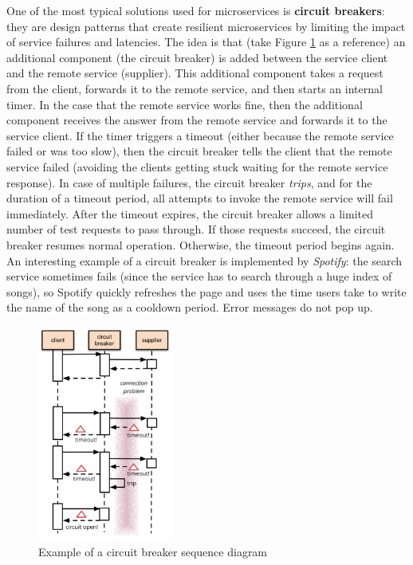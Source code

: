 One of the most typical solutions used for microservices is \textbf{circuit breakers}: they are design patterns that create resilient microservices by limiting the impact of service failures and latencies. The idea is that (take Figure \ref{fig:circuit-breaker} as a reference) an additional component (the circuit breaker) is added between the service client and the remote service (supplier). This additional component takes a request from the client, forwards it to the remote service, and then starts an internal timer. In the case that the remote service works fine, then the additional component receives the answer from the remote service and forwards it to the service client. If the timer triggers a timeout (either because the remote service failed or was too slow), then the circuit breaker tells the client that the remote service failed (avoiding the clients getting stuck waiting for the remote service response). In case of multiple failures, the circuit breaker \textit{trips}, and for the duration of a timeout period, all attempts to invoke the remote service will fail immediately. After the timeout expires, the circuit breaker allows a limited number of test requests to pass through. If those requests succeed, the circuit breaker resumes normal operation. Otherwise, the timeout period begins again.\\

An interesting example of a circuit breaker is implemented by \textit{Spotify}: the search service sometimes fails (since the service has to search through a huge index of songs), so Spotify quickly refreshes the page and uses the time users take to write the name of the song as a cooldown period. Error messages do not pop up.

\begin{figure} [H]
    \centering
    \includegraphics[width=0.4\textwidth]{images/Microservices/circuit-breaker.PNG}
    \caption{Example of a circuit breaker sequence diagram}
    \label{fig:circuit-breaker}
\end{figure} 

